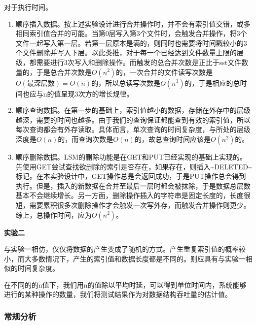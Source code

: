 \documentclass{article}
\begin{document}
对于执行时间。
\begin{enumerate}
	\item 顺序插入数据。按上述实验设计进行合并操作时，并不会有索引值交错，或多相同索引值合并的可能。当第0层写入第3个文件时，会触发合并操作，将3个文件一起写入第一层。若第一层原本是满的，则同时也需要将时间戳较小的3个文件删除并写入下层。以此类推，对于每一个已经达到文件数量上限的层级，都需要进行3次写入和删除操作。而触发的总合并次数是正比于sst文件数量的，于是总合并次数是$O(n^2)$的，一次合并的文件读写次数是$O(\textrm{最深层数})=O(n)$的，所以总读写次数是$O(n^3)$的，于是相应的总时间也应与n的值呈现3次方的增长规律。
	\item 顺序查询数据。在第一步的基础上，索引值越小的数据，存储在外存中的层级越深，需要的时间也越多。由于我们的查询保证都能查到有效的索引值，所以每次查询都会有外存读取。具体而言，单次查询的时间复杂度，与所处的层级深度是$O(n)$的，而查询次数是$O(n)$的，故总查询时间应该是$O(n^2)$的。
	\item 顺序删除数据。LSM的删除功能是在GET和PUT已经实现的基础上实现的。先使用GET尝试查找欲删除的索引是否存在，如果存在，则插入\textasciitilde DELETED\textasciitilde 标记。在本实验设计中，GET操作总是会返回成功，于是PUT操作总会得到执行。但是，插入的新数据在合并至最后一层时都会被抹除，于是数据总层数基本不会继续增长。另一方面，删除操作插入的字符串是固定长度的，长度很短，需要累积很多次删除操作才会触发一次写外存，而触发合并操作则更少。综上，总操作时间，应为$O(n^2)$。
\end{enumerate}

\textbf{实验二}

与实验一相仿，仅仅将数据的产生变成了随机的方式。产生重复索引值的概率较小，而大多数情况下，产生的索引值和数据长度都是不同的。则应具有与实验一相似的时间复杂度。

在不同的的n值下，我们用n的值除以平均时延，可以得到单位时间内，系统能够进行的某种操作的数量，我们将测试结果作为对数据结构吞吐量的估计值。


\subsubsection{常规分析}
\end{document}

